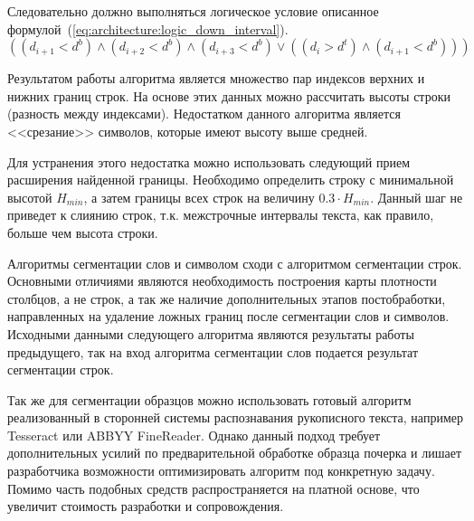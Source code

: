 Следовательно должно выполняться логическое условие описанное формулой~(\ref{eq:architecture:logic_down_interval}).
\begin{equation}
  \label{eq:architecture:logic_down_interval}
  ((d_{i+1} < d^{b}) \wedge (d_{i+2} < d^{b}) \wedge (d_{i+3} < d^{b}) \vee ((d_i > d^{t}) \wedge (d_{i+1} < d^{b})))
\end{equation}

Результатом работы алгоритма является множество пар индексов верхних и нижних границ строк. На основе этих данных можно рассчитать высоты строки (разность между индексами). Недостатком данного алгоритма является <<срезание>> символов, которые имеют высоту выше средней.

Для устранения этого недостатка можно использовать следующий прием расширения найденной границы. Необходимо определить строку с минимальной высотой $ H_{min} $, а затем границы всех строк на величину $ 0.3 \cdot  H_{min} $. Данный шаг не приведет к слиянию строк, т.к. межстрочные интервалы текста, как правило, больше чем высота строки.
 
Алгоритмы сегментации слов и символом сходи с алгоритмом сегментации строк. Основными отличиями являются необходимость построения карты плотности столбцов, а не строк, а так же наличие дополнительных этапов постобработки, направленных на удаление ложных границ после сегментации слов и символов. Исходными данными следующего алгоритма являются результаты работы предыдущего, так на вход алгоритма сегментации слов подается результат сегментации строк.

Так же для сегментации образцов можно использовать готовый алгоритм реализованный в сторонней системы распознавания рукописного текста, например Tesseract или ABBYY FineReader. Однако данный подход требует дополнительных усилий по предварительной обработке образца почерка и лишает разработчика возможности оптимизировать алгоритм под конкретную задачу. Помимо часть подобных средств распространяется на платной основе, что увеличит стоимость разработки и сопровождения.

